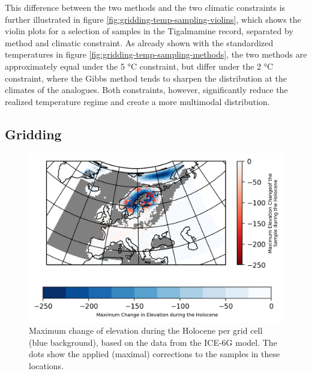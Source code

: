 \begin{refsection}
This difference between the two methods and the two climatic constraints is further illustrated in figure \ref{fig:gridding-temp-sampling-violins}, which shows the violin plots for a selection of samples in the Tigalmamine record, separated by method and climatic constraint. As already shown with the standardized temperatures in figure \ref{fig:gridding-temp-sampling-methods}, the two methods are approximately equal under the 5 °C constraint, but differ under the 2 °C constraint, where the Gibbs method tends to sharpen the distribution at the climates of the analogues. Both constraints, however, significantly reduce the realized temperature regime and create a more multimodal distribution.

\subsection{Gridding}  \label{sec:gridding-gridding}

\begin{figure}
	\includegraphics[width=\linewidth]{gridding-figures/elevation-difference.png}
	\caption[Elevation difference and corrections]{Maximum change of elevation during the Holocene per grid cell (blue background), based on the data from the ICE-6G model. The dots show the applied (maximal) corrections to the samples in these locations. }
	\label{fig:gridding-elev-correction}
\end{figure}


\end{refsection}
